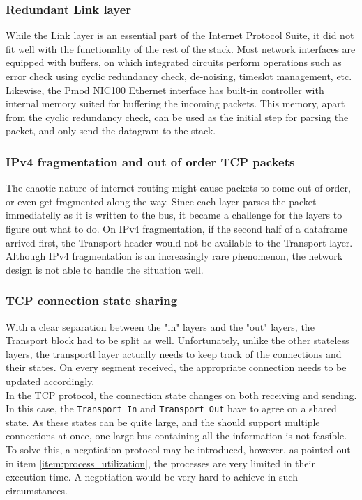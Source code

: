 \subsubsection{Redundant Link layer}
While the Link layer is an essential part of the Internet Protocol Suite, it did
not fit well with the functionality of the rest of the stack.
Most network interfaces are equipped with buffers, on which integrated circuits
perform operations such as error check using cyclic redundancy check, de-noising,
timeslot management, etc.
Likewise, the Pmod NIC100 Ethernet interface has built-in controller with
internal memory suited for buffering the incoming packets\cite{microchip_enc424j600}.
This memory, apart from the cyclic redundancy check, can be used as the initial
step for parsing the packet, and only send the datagram to the stack.


\subsubsection{IPv4 fragmentation and out of order TCP packets}
The chaotic nature of internet routing might cause packets to come out of order,
or even get fragmented along the way. Since each layer parses the packet immediatelly
as it is written to the bus, it became a challenge for the layers to figure out
what to do. On IPv4 fragmentation, if the second half of a dataframe arrived
first, the Transport header would not be available to the Transport layer.
Although IPv4 fragmentation is an increasingly rare phenomenon, the network
design is not able to handle the situation well.


\subsubsection{TCP connection state sharing}
With a clear separation between the "in" layers and the "out" layers, the
Transport block had to be split as well. Unfortunately, unlike the other stateless
layers, the transportl layer actually needs to keep track of the connections and
their states. On every segment received, the appropriate connection needs to be
updated accordingly.\\
In the TCP protocol, the connection state changes on both receiving and sending.
In this case, the \texttt{Transport In} and \texttt{Transport Out} have to
agree on a shared state. As these states can be quite large, and the should
support multiple connections at once, one large bus containing all the information
is not feasible. To solve this, a negotiation protocol may be introduced, however,
as pointed out in item \ref{item:process_utilization}, the processes are very
limited in their execution time. A negotiation would be very hard to achieve in
such circumstances.


